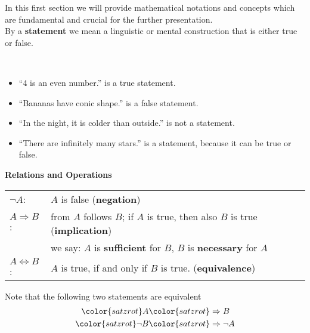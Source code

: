 
\begin{frame}
	In this first section we will provide mathematical notations and concepts which are fundamental and crucial for the further presentation.\\
	\vspace{0.2cm}
		\vspace{0.2cm}
	By a \textbf{statement} we mean a linguistic or mental construction that is either true or false.
	\vspace{0.2cm}
	\begin{ex}~\\\vspace{0.1cm}
		\begin{itemize}
		\item ``4 is an even number.'' is a true statement.
		\item ``Bananas have conic shape.'' is a false statement.
		\item ``In the night, it is colder than outside.'' is not a statement.
		\item ``There are infinitely many stars.'' is a statement, because it can be true or false.
		\end{itemize}
	\end{ex}
	\vspace{0.2cm}
	\textbf{Relations and Operations}
	\color{defgruen}
	\begin{center} \vspace{-0.1cm}
		\begin{tabular}[t]{ll}
			$\neg A$: & $A$ is false (\textbf{negation})\\\vspace{0.2cm}
			$A\Rightarrow B$: & from $A$ follows $B$; if $A$ is true, then also $B$ is true (\textbf{implication})\\\vspace{0.2cm}
			& we say: $A$ is \textbf{sufficient} for $B$, $B$ is \textbf{necessary} for $A$\\\vspace{0.2cm}
			$A\Leftrightarrow B$: & $A$ is true, if and only if  $B$ is true. (\textbf{equivalence})
		\end{tabular}
	\end{center}
\color{fontcolor}
	Note that the following two statements are equivalent
	\begin{align*}
	\color{satzrot}A&\color{satzrot}\Rightarrow B\\
	\color{satzrot}\neg B&\color{satzrot} \Rightarrow \neg A 
	\end{align*}
\end{frame}

